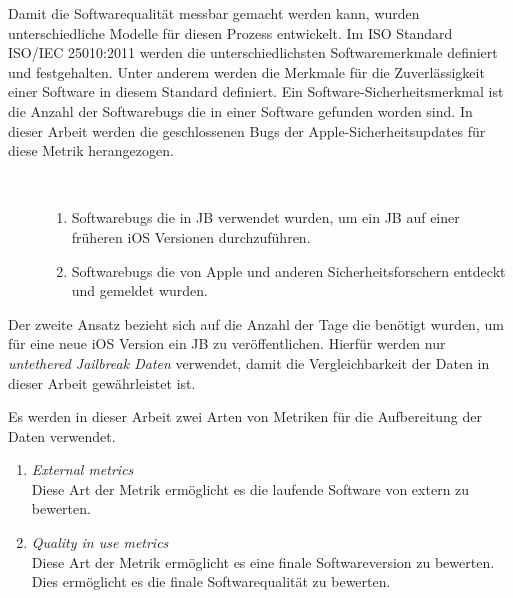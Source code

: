 Damit die Softwarequalität messbar gemacht werden kann, wurden unterschiedliche Modelle für diesen Prozess entwickelt. Im ISO Standard ISO/IEC 25010:2011 werden die unterschiedlichsten Softwaremerkmale definiert und festgehalten. \cite{IOS25010} Unter anderem werden die Merkmale für die Zuverlässigkeit einer Software in diesem Standard definiert. Ein Software-Sicherheitsmerkmal ist die Anzahl der Softwarebugs die in einer Software gefunden worden sind. In dieser Arbeit werden die geschlossenen Bugs der Apple-Sicherheitsupdates für diese Metrik herangezogen.
\begin{description}
    \item[\parbox{\textwidth} {In dieser Arbeit werden zwei Arten von Bugs unterschieden, die in den iOS Sicherheitsupdates geschlossen werden}]~\par
    \begin{enumerate}
        \item Softwarebugs die in JB verwendet wurden, um ein JB auf einer früheren iOS Versionen durchzuführen. 
        \item Softwarebugs die von Apple und anderen Sicherheitsforschern entdeckt und gemeldet wurden.
    \end{enumerate}
\end{description} 
 \par
Der zweite Ansatz bezieht sich auf die Anzahl der Tage die benötigt wurden, um für eine neue iOS Version ein JB zu veröffentlichen. Hierfür werden nur \textit{\glqq untethered Jailbreak Daten\grqq{}} verwendet, damit die Vergleichbarkeit der Daten in dieser Arbeit gewährleistet ist.\par 
Es werden in dieser Arbeit zwei Arten von Metriken für die Aufbereitung der Daten verwendet.
\begin{enumerate}
    \item \textit{\glqq External metrics\grqq{}}\\
    Diese Art der Metrik ermöglicht es die laufende Software von extern zu bewerten.
    \item \textit{\glqq Quality in use metrics\grqq{}} \\
    Diese Art der Metrik ermöglicht es eine finale Softwareversion zu bewerten. Dies ermöglicht es die finale Softwarequalität zu bewerten.
\end{enumerate}



